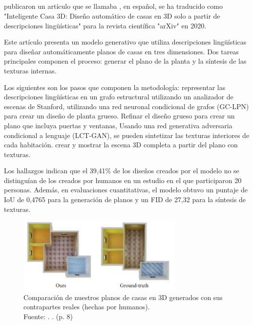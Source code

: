 \subsection{}
\cite{pr_chen2020intelhome3d} publicaron un artículo que se llamaba , en español, se ha traducido como "Inteligente Casa 3D: Diseño automático de casas en 3D solo a partir de descripciones lingüísticas" para la revista científica "arXiv" en 2020.

Este artículo presenta un modelo generativo que utiliza descripciones lingüísticas para diseñar automáticamente planos de casas en tres dimensiones. Dos tareas principales componen el proceso: generar el plano de la planta y la síntesis de las texturas internas.

Los siguientes son los pasos que componen la metodología: representar las descripciones lingüísticas en un grafo estructural utilizando un analizador de escenas de Stanford, utilizando una red neuronal condicional de grafos (GC-LPN) para crear un diseño de planta grueso. Refinar el diseño grueso para crear un plano que incluya puertas y ventanas, Usando una red generativa adversaria condicional a lenguaje (LCT-GAN), se pueden sintetizar las texturas interiores de cada habitación. crear y mostrar la escena 3D completa a partir del plano con texturas.

Los hallazgos indican que el 39,41\% de los diseños creados por el modelo no se distinguían de los creados por humanos en un estudio en el que participaron 20 personas. Además, en evaluaciones cuantitativas, el modelo obtuvo un puntaje de IoU de 0,4765 para la generación de planos y un FID de 27,32 para la síntesis de texturas.

\begin{figure}[!ht]
	\begin{center}
		\includegraphics[width=0.73\textwidth]{2/figures/chen2020.png}
		\caption[Comparación de nuestros planos de casas en 3D generados con sus contrapartes reales (hechas por humanos)]{Comparación de nuestros planos de casas en 3D generados con sus contrapartes reales (hechas por humanos).\\
		Fuente: \cite{pr_chen2020intelhome3d}. . (p. 8)}
		\label{2:fig122}
	\end{center}
\end{figure}

